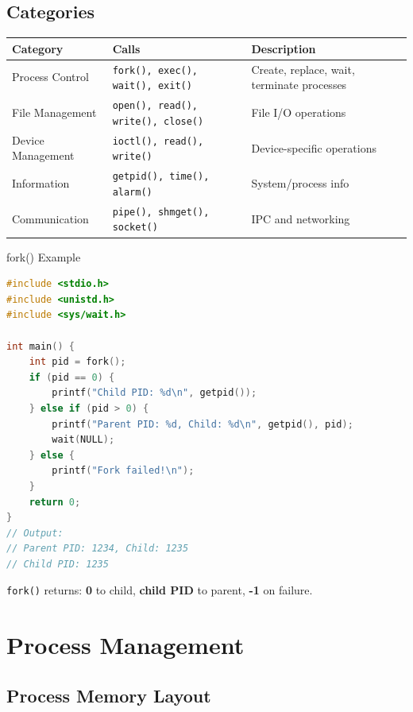 \documentclass[12pt,a4paper]{article}
\begin{document}
\subsection{Categories}

\begin{center}
\begin{tabular}{@{} l l p{7cm} @{}}
\toprule
\textbf{Category} & \textbf{Calls} & \textbf{Description} \\
\midrule
Process Control & \texttt{fork(), exec(), wait(), exit()} & Create, replace, wait, terminate processes \\
File Management & \texttt{open(), read(), write(), close()} & File I/O operations \\
Device Management & \texttt{ioctl(), read(), write()} & Device-specific operations \\
Information & \texttt{getpid(), time(), alarm()} & System/process info \\
Communication & \texttt{pipe(), shmget(), socket()} & IPC and networking \\
\bottomrule
\end{tabular}
\end{center}

\begin{examplebox}{fork() Example}
\begin{lstlisting}[language=C]
#include <stdio.h>
#include <unistd.h>
#include <sys/wait.h>

int main() {
    int pid = fork();
    if (pid == 0) {
        printf("Child PID: %d\n", getpid());
    } else if (pid > 0) {
        printf("Parent PID: %d, Child: %d\n", getpid(), pid);
        wait(NULL);
    } else {
        printf("Fork failed!\n");
    }
    return 0;
}
// Output:
// Parent PID: 1234, Child: 1235
// Child PID: 1235
\end{lstlisting}

\texttt{fork()} returns: \textbf{0} to child, \textbf{child PID} to parent, \textbf{-1} on failure.
\end{examplebox}

\section{Process Management}

\subsection{Process Memory Layout}
\end{document}
